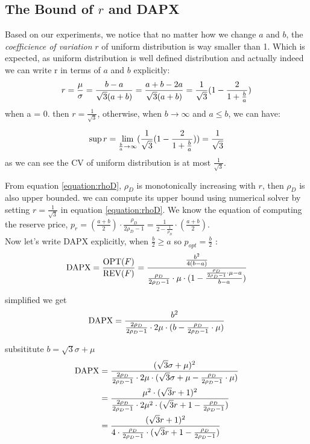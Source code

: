 \subsection{The Bound of $r$ and DAPX}
\label{sec:chap:uniDAPX}
Based on our experiments, we notice that no matter how we change $a$ and $b$, the \textit{coefficience of variation} $r$ of uniform distribution is way smaller than 1. Which is expected, as uniform distribution is well defined distribution and actually indeed we can write r in terms of $a$ and $b$ explicitly:
\begin{equation}\notag
r = \frac{\mu}{\sigma} = \frac {b-a}{\sqrt{3}(a+b)} = \frac {a+b-2a}{\sqrt{3}(a+b)} = \frac {1}{\sqrt{3}} (1-  \frac {2}{1+\frac{b}{a}})
\end{equation} 
when a = 0. then $r = \frac {1}{\sqrt{3}}$, otherwise, when $b \rightarrow \infty$ and $a\leqslant b$, we can have:

\begin{equation}\notag
\sup r = \displaystyle{\lim_{\frac{b}{a} \to \infty}}(\frac {1}{\sqrt{3}} (1-  \frac {2}{1+\frac{b}{a}})) = \frac {1}{\sqrt{3}}  
\end{equation} 
as we can see the CV of uniform distribution is at most $\frac {1}{\sqrt{3}}$.

From  equation \ref{equation:rhoD}, $\rho_D$ is monotonically increasing with $r$, then $\rho_D$ is also upper bounded. we can compute its upper bound using numerical solver by setting $r = \frac {1}{\sqrt{3}}$ in equation \ref{equation:rhoD}. We know the equation of computing the reserve price, $p_r =  (\frac{a+b}{2}) \cdot \frac{\rho_{D}}{2\rho_{D}-1} =\frac{1}{2-\frac{1}{\rho_D}}\cdot (\frac{a+b}{2})$. \\
Now let's write DAPX explicitly, when $\frac{b}{2} \geqslant a$ so $p_{opt} = \frac{b}{2}$ : 
\begin{equation}\notag
\text{DAPX} = \frac{\text{OPT}(F)}{\text{REV}(F)} =  \frac{\frac{b^{2}}{4(b-a)}}{\frac{\rho_{D}}{2\rho_{D}-1}\cdot \mu \cdot (1-\frac{\frac{\rho_{D}}{2\rho_{D}-1}\cdot \mu -a}{b-a})}
\end{equation} 

simplified we get 
\begin{equation}\notag
\text{DAPX}=\frac{b^{2}}{\frac{2\rho_{D}}{2\rho_{D}-1}\cdot 2\mu \cdot(b-\frac{\rho_{D}}{2\rho_{D}-1}\cdot \mu)}
\end{equation} 

subsititute $b = \sqrt{3}\sigma + \mu $
\begin{equation}\notag
	\begin{split}	
		\text{DAPX} &=\frac{( \sqrt{3}\sigma + \mu)^{2}}{\frac{2\rho_{D}}{2\rho_{D}-1}\cdot 2\mu \cdot( \sqrt{3}\sigma + \mu-\frac{\rho_{D}}{2\rho_{D}-1}\cdot \mu)} \\&= \frac{\mu^2 \cdot( \sqrt{3}r +1)^{2}}{\frac{2\rho_{D}}{2\rho_{D}-1}\cdot 2\mu^2 \cdot( \sqrt{3}r+ 1-\frac{\rho_{D}}{2\rho_{D}-1})}\\ 
		&= \frac{ ( \sqrt{3}r +1)^{2}}{4 \cdot \frac{ \rho_{D}}{2\rho_{D}-1}\cdot( \sqrt{3}r+ 1-\frac{\rho_{D}}{2\rho_{D}-1})}	
	\end{split}
\end{equation} 


